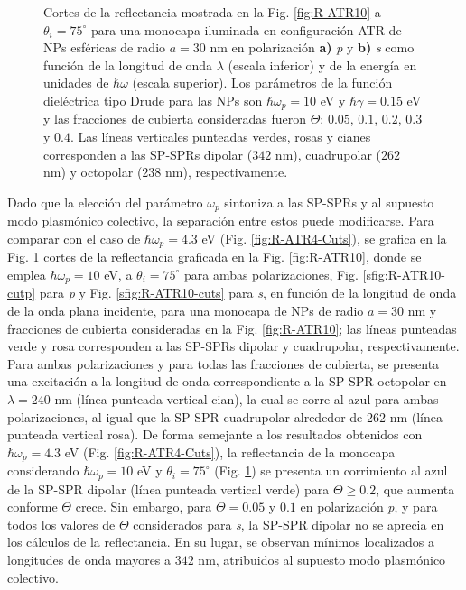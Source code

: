 \begin{figure}[b!]
	\caption{Cortes de la reflectancia mostrada en la Fig. \ref{fig:R-ATR10} a $\theta_i = 75^\circ$ para una monocapa iluminada en configuración ATR de NPs esféricas de radio $a=30$ nm en polarización \textbf{a)} \emph{p} y \textbf{b)} \emph{s} como función de la longitud de onda $\lambda$ (escala inferior) y de la energía en unidades de $\hbar\omega$ (escala superior). Los parámetros de la función dieléctrica tipo Drude para las NPs son $\hbar\omega_p = 10$ eV y $\hbar\gamma = 0.15$ eV y las fracciones de cubierta consideradas fueron $\Theta$: $0. 05$, $0. 1$, $0. 2$, $0. 3$ y $0. 4$. Las líneas verticales punteadas verdes, rosas y cianes corresponden a las SP-SPRs dipolar ($342$ nm), cuadrupolar ($262$ nm) y octopolar ($238$ nm), respectivamente.  }\label{fig:R-ATR10-Cuts}
	\end{figure}

Dado que la elección del parámetro $\omega_p$ sintoniza a las SP-SPRs y al supuesto modo plasmónico colectivo, la separación entre estos puede modificarse. Para comparar con el caso de $\hbar\omega_p=4.3$ eV (Fig. \ref{fig:R-ATR4-Cuts}), se grafica en la Fig. \ref{fig:R-ATR10-Cuts} cortes de la reflectancia graficada en la Fig. \ref{fig:R-ATR10}, donde se emplea $\hbar\omega_p = 10$ eV, a $\theta_i = 75^\circ$ para ambas polarizaciones,  Fig. \ref{sfig:R-ATR10-cutp} para \emph{p} y Fig. \ref{sfig:R-ATR10-cuts} para \emph{s}, en  función de la longitud de onda de la onda plana incidente, para una monocapa de NPs de radio $a= 30$ nm  y fracciones de cubierta consideradas en la Fig. \ref{fig:R-ATR10}; las líneas punteadas verde y rosa  corresponden a las SP-SPRs dipolar y cuadrupolar, respectivamente. Para ambas polarizaciones y para todas las fracciones de cubierta, se presenta una excitación a la longitud de onda correspondiente a la SP-SPR octopolar en $\lambda=240$ nm (línea punteada vertical cian), la cual se corre al azul para ambas polarizaciones, al igual que  la SP-SPR cuadrupolar alrededor de $262$ nm (línea punteada vertical rosa). De forma semejante a los resultados obtenidos con $\hbar\omega_p = 4.3$ eV (Fig. \ref{fig:R-ATR4-Cuts}), la reflectancia de la monocapa considerando $\hbar\omega_p=10$ eV y $\theta_i=75^\circ$ (Fig. \ref{fig:R-ATR10-Cuts}) se presenta un corrimiento al azul de la SP-SPR dipolar (línea punteada vertical verde) para $\Theta\geq 0.2$, que aumenta conforme $\Theta$ crece. Sin embargo, para $\Theta=0.05$ y $0.1$ en polarización \emph{p}, y para todos los valores de $\Theta$ considerados para \emph{s}, la SP-SPR dipolar no se aprecia en los cálculos de la reflectancia. En su lugar, se observan mínimos  localizados a longitudes de onda mayores a $342$ nm, atribuidos al supuesto modo plasmónico colectivo.

